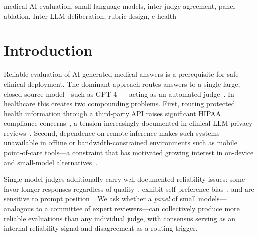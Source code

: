 \documentclass[conference]{IEEEtran}
\begin{document}
\begin{IEEEkeywords}
medical AI evaluation, small language models, inter-judge agreement,
panel ablation, Inter-LLM deliberation, rubric design, e-health
\end{IEEEkeywords}

\section{Introduction}

Reliable evaluation of AI-generated medical answers is a prerequisite
for safe clinical deployment. The dominant approach routes answers to a
single large, closed-source model---such as GPT-4~\cite{achiam2023gpt}---
acting as an automated judge~\cite{zheng2023judging,li2024llms}.
In healthcare this creates two compounding problems. First, routing
protected health information through a third-party API raises
significant HIPAA compliance concerns~\cite{cohen2018hipaa}, a
tension increasingly documented in clinical-LLM privacy
reviews~\cite{zhong2025privacy,aroua2026privacy}. Second, dependence
on remote inference makes such systems unavailable in offline or
bandwidth-constrained environments such as mobile point-of-care
tools---a constraint that has motivated growing interest in
on-device and small-model alternatives~\cite{lu2024small}.

Single-model judges additionally carry well-documented reliability
issues: some favor longer responses regardless of
quality~\cite{zheng2024large}, exhibit self-preference
bias~\cite{panickssery2024llm}, and are sensitive to prompt
position~\cite{shi2025judging}. We ask whether a \emph{panel} of
small models---analogous to a committee of expert reviewers---can
collectively produce more reliable evaluations than any individual
judge, with consensus serving as an internal reliability signal and
disagreement as a routing trigger.
\end{document}
